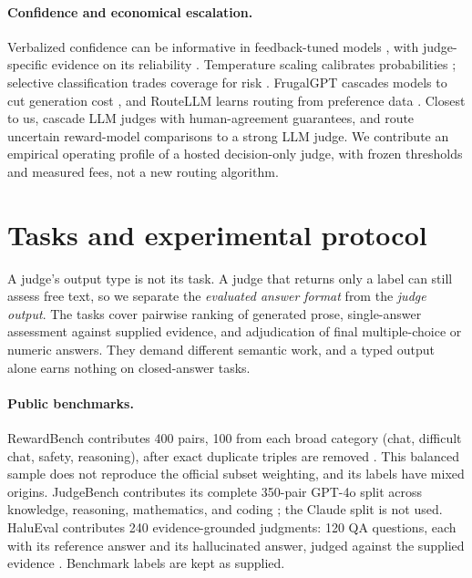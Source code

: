 \documentclass[11pt]{article}
\begin{document}
\paragraph{Confidence and economical escalation.}
Verbalized confidence can be informative in feedback-tuned models \citep{elicitation}, with judge-specific evidence on its reliability \citep{verbalized}. Temperature scaling calibrates probabilities \citep{guo2017}; selective classification trades coverage for risk \citep{selective}. FrugalGPT cascades models to cut generation cost \citep{frugalgpt}, and RouteLLM learns routing from preference data \citep{routellm}. Closest to us, \citet{trustescalate} cascade LLM judges with human-agreement guarantees, and \citet{uncertaintyrouter} route uncertain reward-model comparisons to a strong LLM judge. We contribute an empirical operating profile of a hosted decision-only judge, with frozen thresholds and measured fees, not a new routing algorithm.

\section{Tasks and experimental protocol}
\label{sec:tasks}
A judge's output type is not its task. A judge that returns only a label can still assess free text, so we separate the \emph{evaluated answer format} from the \emph{judge output}. The tasks cover pairwise ranking of generated prose, single-answer assessment against supplied evidence, and adjudication of final multiple-choice or numeric answers. They demand different semantic work, and a typed output alone earns nothing on closed-answer tasks.
\paragraph{Public benchmarks.}
RewardBench contributes 400 pairs, 100 from each broad category (chat, difficult chat, safety, reasoning), after exact duplicate triples are removed \citep{rewardbench}. This balanced sample does not reproduce the official subset weighting, and its labels have mixed origins. JudgeBench contributes its complete 350-pair GPT-4o split across knowledge, reasoning, mathematics, and coding \citep{judgebench}; the Claude split is not used. HaluEval contributes 240 evidence-grounded judgments: 120 QA questions, each with its reference answer and its hallucinated answer, judged against the supplied evidence \citep{halueval}. Benchmark labels are kept as supplied.
\end{document}
